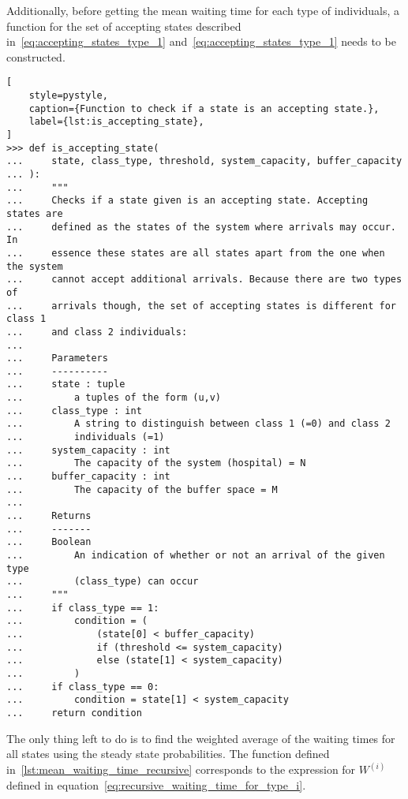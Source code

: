 Additionally, before getting the mean waiting time for each type of individuals,
a function for the set of accepting states described
in~\eqref{eq:accepting_states_type_1} and~\eqref{eq:accepting_states_type_1}
needs to be constructed.

\begin{lstlisting}[
    style=pystyle,
    caption={Function to check if a state is an accepting state.},
    label={lst:is_accepting_state},
]
>>> def is_accepting_state(
...     state, class_type, threshold, system_capacity, buffer_capacity
... ):
...     """
...     Checks if a state given is an accepting state. Accepting states are
...     defined as the states of the system where arrivals may occur. In
...     essence these states are all states apart from the one when the system
...     cannot accept additional arrivals. Because there are two types of
...     arrivals though, the set of accepting states is different for class 1
...     and class 2 individuals:
... 
...     Parameters
...     ----------
...     state : tuple
...         a tuples of the form (u,v)
...     class_type : int
...         A string to distinguish between class 1 (=0) and class 2
...         individuals (=1)
...     system_capacity : int
...         The capacity of the system (hospital) = N
...     buffer_capacity : int
...         The capacity of the buffer space = M
... 
...     Returns
...     -------
...     Boolean
...         An indication of whether or not an arrival of the given type
...         (class_type) can occur
...     """
...     if class_type == 1:
...         condition = (
...             (state[0] < buffer_capacity)
...             if (threshold <= system_capacity)
...             else (state[1] < system_capacity)
...         )
...     if class_type == 0:
...         condition = state[1] < system_capacity
...     return condition

\end{lstlisting}

The only thing left to do is to find the weighted average of the waiting times
for all states using the steady state probabilities.
The function defined in~\ref{lst:mean_waiting_time_recursive}
corresponds to the expression for \(W^{(i)}\)
defined in equation~\eqref{eq:recursive_waiting_time_for_type_i}.

